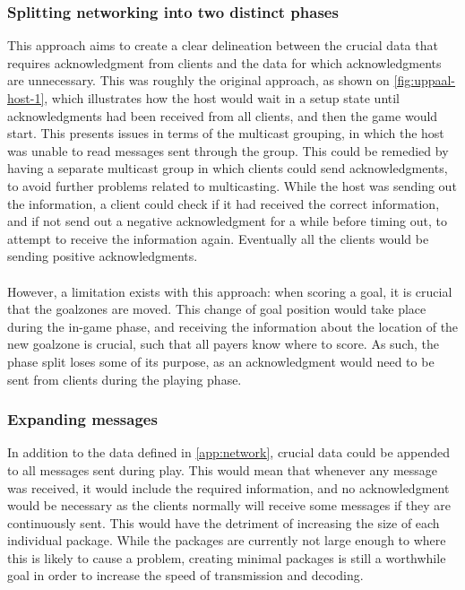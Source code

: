 \subsubsection{Splitting networking into two distinct phases}
This approach aims to create a clear delineation between the crucial data that requires acknowledgment from clients and the data for which acknowledgments are unnecessary.
This was roughly the original approach, as shown on \autoref{fig:uppaal-host-1}, which illustrates how the host would wait in a setup state until acknowledgments had been received from all clients, and then the game would start.
This presents issues in terms of the multicast grouping, in which the host was unable to read messages sent through the group.
This could be remedied by having a separate multicast group in which clients could send acknowledgments, to avoid further problems related to multicasting.
While the host was sending out the information, a client could check if it had received the correct information, and if not send out a negative acknowledgment for a while before timing out, to attempt to receive the information again.
Eventually all the clients would be sending positive acknowledgments.
\\\\
However, a limitation exists with this approach: when scoring a goal, it is crucial that the goalzones are moved.
This change of goal position would take place during the in-game phase, and receiving the information about the location of the new goalzone is crucial, such that all payers know where to score.
As such, the phase split loses some of its purpose, as an acknowledgment would need to be sent from clients during the playing phase.

\subsubsection{Expanding messages}
In addition to the data defined in \autoref{app:network}, crucial data could be appended to all messages sent during play.
This would mean that whenever any message was received, it would include the required information, and no acknowledgment would be necessary as the clients normally will receive some messages if they are continuously sent.
This would have the detriment of increasing the size of each individual package.
While the packages are currently not large enough to where this is likely to cause a problem, creating minimal packages is still a worthwhile goal in order to increase the speed of transmission and decoding.

